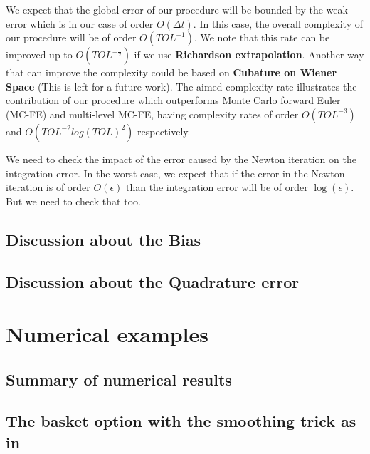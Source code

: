 \documentclass[11pt]{article}
\begin{document}
\begin{remark}
	We expect that the global error of our procedure will be bounded by the weak error which is in our case of order $O(\Delta t)$. In this case, the overall complexity of our procedure will be of order $O(TOL^{-1})$. We note that this rate can be improved up to $O(TOL^{-\frac{1}{2}})$ if we use \textbf{Richardson extrapolation}. Another way that can improve the complexity could be based on \textbf{Cubature on Wiener Space} (This is left for a future work). The aimed complexity rate illustrates the contribution of our procedure which outperforms  Monte Carlo forward Euler (MC-FE) and multi-level MC-FE, having complexity rates of order $O(TOL^{-3})$  and $O(TOL^{-2} log(TOL)^2)$  respectively. 
\end{remark}


\begin{remark}
	\item We need to check the impact of the error caused by the Newton iteration on the integration error. In the worst case, we expect that if the error in the Newton iteration is of order $O(\epsilon)$ than the integration error will be of order $\operatorname{log}(\epsilon)$. But we need to check that too.
	\end{remark}



\subsection{Discussion about the Bias}

\subsection{Discussion about the Quadrature error}
\newpage
\section{Numerical examples}
\subsection{Summary of numerical results}

\subsection{The basket option with the smoothing trick as in \cite{bayersmoothing}}\label{sec:The basket option with smoothing trick with a time stepping procedure}
\end{document}

